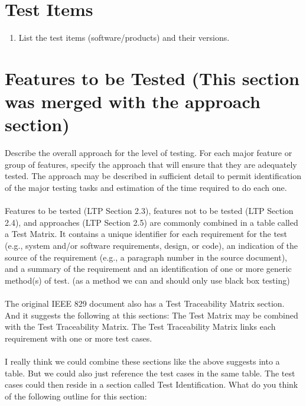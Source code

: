 \section{Test Items}

\begin{enumerate}
	\item List the test items (software/products) and their versions.
\end{enumerate}

\section{Features to be Tested (This section was merged with the approach section)}

Describe the overall approach for the level of testing. For each major feature or group of features,
specify the approach that will ensure that they are adequately tested. The approach may be described in
sufficient detail to permit identification of the major testing tasks and estimation of the time required to
do each one.\\\\
Features to be tested (LTP Section 2.3), features not to be tested (LTP Section 2.4), and approaches
(LTP Section 2.5) are commonly combined in a table called a Test Matrix. It contains a unique
identifier for each requirement for the test (e.g., system and/or software requirements, design, or code),
an indication of the source of the requirement (e.g., a paragraph number in the source document), and a
summary of the requirement and an identification of one or more generic method(s) of test. (as a method we can and should only use black box testing)\\\\

The original IEEE 829 document also has a Test Traceability Matrix section. And it suggests the following at this sections: The Test Matrix may be combined with the Test Traceability Matrix. The Test Traceability Matrix
links each requirement with one or more test cases.\\\\

I really think we could combine these sections like the above suggests into a table. But we could also just reference the test cases in the same table. The test cases could then reside in a section called Test Identification. What do you think of the following outline for this section:\\\\

